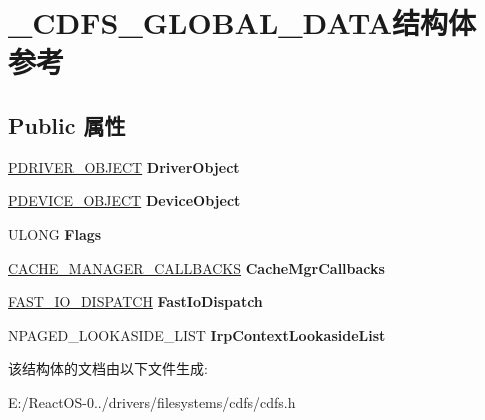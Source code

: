 \hypertarget{struct___c_d_f_s___g_l_o_b_a_l___d_a_t_a}{}\section{\+\_\+\+C\+D\+F\+S\+\_\+\+G\+L\+O\+B\+A\+L\+\_\+\+D\+A\+T\+A结构体 参考}
\label{struct___c_d_f_s___g_l_o_b_a_l___d_a_t_a}
\subsection*{Public 属性}
\begin{DoxyCompactItemize}
\item 
\mbox{\label{struct___c_d_f_s___g_l_o_b_a_l___d_a_t_a_a6748b226449c5aec949775f557757561}} 
\hyperlink{struct___d_r_i_v_e_r___o_b_j_e_c_t}{P\+D\+R\+I\+V\+E\+R\+\_\+\+O\+B\+J\+E\+CT} {\bfseries Driver\+Object}
\item 
\mbox{\label{struct___c_d_f_s___g_l_o_b_a_l___d_a_t_a_a04bd7ba06ca937a8ae43f529f938c52c}} 
\hyperlink{struct___d_e_v_i_c_e___o_b_j_e_c_t}{P\+D\+E\+V\+I\+C\+E\+\_\+\+O\+B\+J\+E\+CT} {\bfseries Device\+Object}
\item 
\mbox{\label{struct___c_d_f_s___g_l_o_b_a_l___d_a_t_a_a7c7cb190a6cb01500b7d1875a8ae4007}} 
U\+L\+O\+NG {\bfseries Flags}
\item 
\mbox{\label{struct___c_d_f_s___g_l_o_b_a_l___d_a_t_a_a273a9c281bc9d6c5ab71e5171a8a9112}} 
\hyperlink{struct___c_a_c_h_e___m_a_n_a_g_e_r___c_a_l_l_b_a_c_k_s}{C\+A\+C\+H\+E\+\_\+\+M\+A\+N\+A\+G\+E\+R\+\_\+\+C\+A\+L\+L\+B\+A\+C\+KS} {\bfseries Cache\+Mgr\+Callbacks}
\item 
\mbox{\label{struct___c_d_f_s___g_l_o_b_a_l___d_a_t_a_a6f3e2ee90f630347cdc785f96db71acb}} 
\hyperlink{struct___f_a_s_t___i_o___d_i_s_p_a_t_c_h}{F\+A\+S\+T\+\_\+\+I\+O\+\_\+\+D\+I\+S\+P\+A\+T\+CH} {\bfseries Fast\+Io\+Dispatch}
\item 
\mbox{\label{struct___c_d_f_s___g_l_o_b_a_l___d_a_t_a_a3b73a904f6f5c8e3460d5d7cf50737b8}} 
N\+P\+A\+G\+E\+D\+\_\+\+L\+O\+O\+K\+A\+S\+I\+D\+E\+\_\+\+L\+I\+ST {\bfseries Irp\+Context\+Lookaside\+List}
\end{DoxyCompactItemize}


该结构体的文档由以下文件生成\+:\begin{DoxyCompactItemize}
\item 
E\+:/\+React\+O\+S-\/0../drivers/filesystems/cdfs/cdfs.\+h\end{DoxyCompactItemize}
